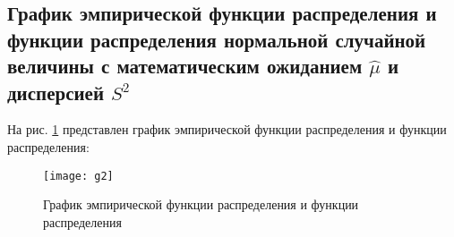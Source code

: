 \documentclass[a4paper, 12pt]{article}
\theoremstyle{definition}
\begin{document}
\newpage
\subsection{График эмпирической функции распределения и функции распределения нормальной случайной величины с математическим ожиданием $\hat{\mu}$ и дисперсией $S^2$}

На рис. \ref{fig:g2} представлен график эмпирической функции распределения и функции распределения:
	
	\begin{figure}[H]
        	\begin{center}
        		\texttt{[image: g2]}
        		\caption{График эмпирической функции распределения и функции распределения}
        		\label{fig:g2}
        	\end{center}
        \end{figure}
\end{document}
